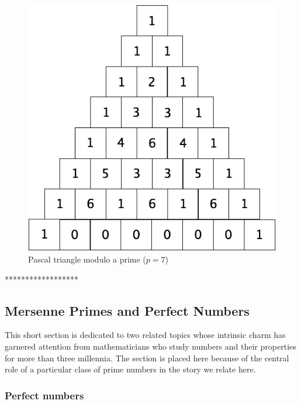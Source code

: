 {\begin{figure}[ht]
\begin{center}
        \includegraphics[scale=0.3]{FiguresArithmetic/TrianglePascalModulo7.png}
        \caption{Pascal triangle modulo a prime ($p=7$)}
        \label{fig:TriangleModulo7}
\end{center}
\end{figure}
******************}


\subsection{Mersenne Primes and Perfect Numbers}
\label{sec:perfect-numbers+Mersenne-primes}

This short section is dedicated to two related topics whose intrinsic
charm has garnered attention from mathematicians who study numbers and
their properties for more than three millennia.  The section is placed
here because of the central role of a particular class of prime
numbers in the story we relate here.

\subsubsection{Perfect numbers}
\label{sec:perfect-numbers}

